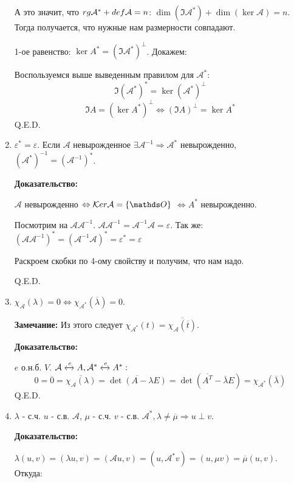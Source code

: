 \begin{enumerate}
А это значит, что $rg \mathcal{A}^* + def \mathcal{A} = n$: $\dim (\Im \mathcal{A}^*) + \dim (\ker \mathcal{A}) = n$.
Тогда получается, что нужные нам размерности совпадают.

1-ое равенство: $\ker A^* = (\Im \mathcal{A}^*)^\perp$. Докажем:

Воспользуемся выше выведенным правилом для $\mathcal{A}^*$:
$$\Im(\mathcal{A}^*)^* = \ker (\mathcal{A}^*)^\perp$$
$$\Im A  =  (\ker A^*) ^\perp \Leftrightarrow (\Im A)^\perp = \ker A^*$$
\hfill Q.E.D.

\item $\varepsilon^* = \varepsilon$. Если $\mathcal{A}$ невырожденное $\exists \mathcal{A}^{-1} \Rightarrow \mathcal{A}^*$ невырожденно, $(\mathcal{A}^*)^{-1} = (\mathcal{A}^{-1})^*$.

\textbf{Доказательство:}

$\mathcal{A}$ невырожденно $\Leftrightarrow \ker \mathcal{A} = \{\zero\}$ $\Leftrightarrow A^*$ невырожденно.

Посмотрим на $\mathcal{A}\mathcal{A}^{-1}$. $\mathcal{A}\mathcal{A}^{-1}= \mathcal{A}^{-1}\mathcal{A} = \varepsilon$. Так же:
$(\mathcal{A}\mathcal{A}^{-1})^*= (\mathcal{A}^{-1}\mathcal{A})^* = \varepsilon^* = \varepsilon$

Раскроем скобки по 4-ому свойству и получим, что нам надо.

\hfill Q.E.D.

\item $\chi_\mathcal{A}(\lambda) = 0  \Leftrightarrow \chi_{\mathcal{A}^*}(\overline{\lambda})=0$.

\textbf{Замечание:}  Из этого следует $\chi_{\mathcal{A}^*}(t)=\overline{\chi_\mathcal{A}(\overline{t})}$.

\textbf{Доказательство:}

$e$ о.н.б. $V$. $\mathcal{A} \xleftrightarrow{e}A, \mathcal{A}^* \xleftrightarrow{e}A^*:$
$$0 = \overline{ 0} = \overline{\chi_\mathcal{A}(\lambda)}= \overline{\det (A - \lambda E)} = \det (\overline{A^T} - \overline{\lambda} E) = \chi_{\mathcal{A}^*} (\overline{\lambda})$$
\hfill Q.E.D.

\item $\lambda$ - с.ч. $u$ - с.в. $\mathcal{A}$, $\mu$ - с.ч. $v$ - с.в. $\mathcal{A^*}, \lambda \neq \overline{\mu} \Rightarrow u \perp v$.

\textbf{Доказательство:}

$\lambda(u,v)=(\lambda u,v)=(\mathcal{A}u, v ) = (u,\mathcal{A}^* v) = (u, \mu v) = \overline{\mu}(u,v)$. Откуда:


\end{enumerate}
